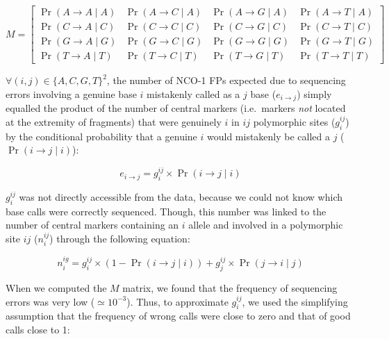 \begin{equation*}
M = \begin{bmatrix}
\Pr( A\rightarrow A \mid A) & \Pr( A\rightarrow C \mid A) & \Pr( A\rightarrow G \mid A) & \Pr( A\rightarrow T \mid A) \\
\Pr( C\rightarrow A \mid C) & \Pr( C\rightarrow C \mid C) & \Pr( C\rightarrow G \mid C) & \Pr( C\rightarrow T \mid C) \\
\Pr( G\rightarrow A \mid G) & \Pr( G\rightarrow C \mid G) & \Pr( G\rightarrow G \mid G) & \Pr( G\rightarrow T \mid G) \\
\Pr( T\rightarrow A \mid T) & \Pr( T\rightarrow C \mid T) & \Pr( T\rightarrow G \mid T) & \Pr( T\rightarrow T \mid T) 
\end{bmatrix}
\end{equation*}




\newpage


$\forall (i,j) \in \{A, C, G, T\}^2$, the number of NCO-1 FPs expected due to sequencing errors involving a genuine base $i$ mistakenly called as a $j$ base ($e_{i\rightarrow j}$) simply equalled the product of the number of central markers (i.e.\ markers \textit{not} located at the extremity of fragments) that were genuinely $i$ in $ij$ polymorphic sites ($g_{i}^{ij}$) by the conditional probability that a genuine $i$ would mistakenly be called a $j$ ($\Pr( i\rightarrow j \mid i )$):

\begin{equation} \label{eq:nb-errors}
	e_{i\rightarrow j} = g_{i}^{ij} \times \Pr( i\rightarrow j \mid i )
\end{equation}


$g_{i}^{ij}$ was not directly accessible from the data, because we could not know which base calls were correctly sequenced.
Though, this number was linked to the number of central markers containing an $i$ allele and involved in a polymorphic site $ij$ ($n_{i}^{ij}$) through the following equation:

\begin{equation} \label{eq:genuine-to-called}
	n_{i}^{ig} = g_{i}^{ij} \times ( 1 - \Pr( i\rightarrow j \mid i ) ) + g_{j}^{ij} \times \Pr( j\rightarrow i \mid j )
\end{equation}


When we computed the $M$ matrix, we found that the frequency of sequencing errors was very low ($\simeq 10^{-3}$).
Thus, to approximate $g_{i}^{ij}$, we used the simplifying assumption that the frequency of wrong calls were close to zero and that of good calls close to 1:


